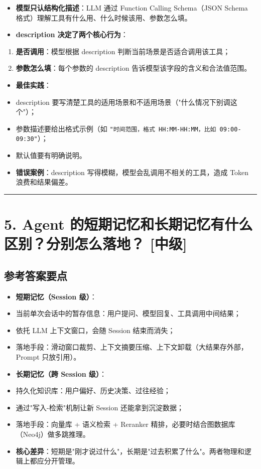 \documentclass[9pt,a4paper,twocolumn]{ctexart}
\newcommand{\lvzhong}{\usebox{\badgezhongbox}}
\def\lvzhong{[中级]}%
\begin{document}
\begin{itemize}[itemsep=1pt, topsep=2pt]
  \item \textbf{模型只认结构化描述}：LLM 通过 Function Calling Schema（JSON Schema 格式）理解工具有什么用、什么时候该用、参数怎么填。
  \item \textbf{description 决定了两个核心行为}：
\end{itemize}
\begin{enumerate}[itemsep=1pt, topsep=2pt]
  \item \textbf{是否调用}：模型根据 description 判断当前场景是否适合调用该工具；
  \item \textbf{参数怎么填}：每个参数的 description 告诉模型该字段的含义和合法值范围。
\end{enumerate}
\begin{itemize}[itemsep=1pt, topsep=2pt]
  \item \textbf{最佳实践}：
  \item description 要写清楚工具的适用场景和不适用场景（"什么情况下别调这个"）；
  \item 参数描述要给出格式示例（如 \texttt{"时间范围，格式 HH:MM-HH:MM，比如 09:00-09:30"}）；
  \item 默认值要有明确说明。
  \item \textbf{错误案例}：description 写得模糊，模型会乱调用不相关的工具，造成 Token 浪费和结果偏差。
\end{itemize}


\vspace{2pt}
\noindent\rule{\columnwidth}{0.3pt}\vspace{2pt}



\section*{5. Agent 的短期记忆和长期记忆有什么区别？分别怎么落地？ \lvzhong{}}


\subsection*{参考答案要点}

\begin{itemize}[itemsep=1pt, topsep=2pt]
  \item \textbf{短期记忆（Session 级）}：
  \item 当前单次会话中的暂存信息：用户提问、模型回复、工具调用中间结果；
  \item 依托 LLM 上下文窗口，会随 Session 结束而消失；
  \item 落地手段：滑动窗口裁剪、上下文摘要压缩、上下文卸载（大结果存外部，Prompt 只放引用）。
  \item \textbf{长期记忆（跨 Session 级）}：
  \item 持久化知识库：用户偏好、历史决策、过往经验；
  \item 通过"写入-检索"机制让新 Session 还能拿到沉淀数据；
  \item 落地手段：向量库 + 语义检索 + Reranker 精排，必要时结合图数据库（Neo4j）做多跳推理。
  \item \textbf{核心差异}：短期是"刚才说过什么"，长期是"过去积累了什么"。两者物理和逻辑上都应分开管理。
\end{itemize}
\end{document}
